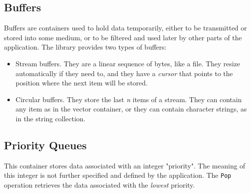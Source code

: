 \documentclass[12pt,a4paper]{memoir} %
\begin{document}
\subsection{Buffers}
Buffers are containers used to hold data temporarily, either to be transmitted or stored into some medium, or to be filtered and used later
by other parts of the application. The library provides two types of buffers:
\begin{itemize}
\item Stream buffers. They are a linear sequence of bytes, like a file. They resize automatically if they need to, and they have a \textsl{cursor}
that points to the position where the next item will be stored.
\item Circular buffers. They store the last \textsl{n} items of a stream. They can contain any item as in the vector container, or they can contain 
character strings, as in the string collection.
\end{itemize}
\subsection{Priority Queues}
This container stores data associated with an integer "priority". The meaning of this integer is not further specified and defined by the application.
The \verb,Pop, operation retrieves the data associated with the \textsl{lowest} priority. 
\end{document}
